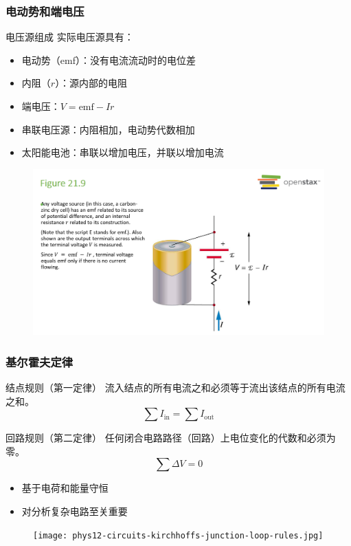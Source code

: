 \documentclass{beamer}
\begin{document}
\begin{frame}
    \frametitle{电动势和端电压}
    \begin{block}{电压源组成}
        实际电压源具有：
        \begin{itemize}
            \item 电动势（emf）：没有电流流动时的电位差
            \item 内阻（$r$）：源内部的电阻
        \end{itemize}
    \end{block}
    \begin{itemize}
        \item 端电压：$V = \text{emf} - Ir$
        \item 串联电压源：内阻相加，电动势代数相加
        \item 太阳能电池：串联以增加电压，并联以增加电流
    \end{itemize}
\end{frame}
\begin{frame}
    \begin{figure}
        \centering
        \includegraphics[width=1\linewidth]{phys12-circuits-internal-resistance.png}
    \end{figure}
\end{frame}
\begin{frame}
    \frametitle{基尔霍夫定律}
    \begin{block}{结点规则（第一定律）}
        流入结点的所有电流之和必须等于流出该结点的所有电流之和。
        \[ \sum I_{\text{in}} = \sum I_{\text{out}} \]
    \end{block}
    \begin{block}{回路规则（第二定律）}
        任何闭合电路路径（回路）上电位变化的代数和必须为零。
        \[ \sum \Delta V = 0 \]
    \end{block}
    \begin{itemize}
        \item 基于电荷和能量守恒
        \item 对分析复杂电路至关重要
    \end{itemize}
\end{frame}
\begin{frame}{}
    \begin{figure}
        \centering
        \texttt{[image: phys12-circuits-kirchhoffs-junction-loop-rules.jpg]}
    \end{figure}
\end{frame}
\end{document}
